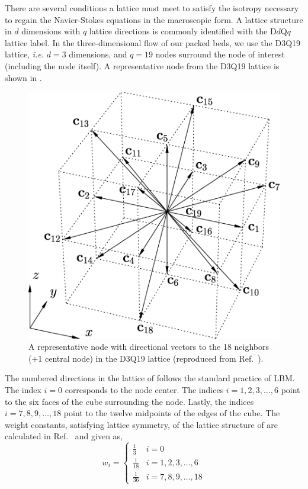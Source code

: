 There are several conditions a lattice must meet to satisfy the isotropy necessary to regain the Navier-Stokes equations in the macroscopic form.\cite{Viggen2009,Latt2007} A lattice structure in $d$ dimensions with $q$ lattice directions is commonly identified with the D$d$Q$q$ lattice label. In the three-dimensional flow of our packed beds, we use the D3Q19 lattice, \textit{i.e.} $d=3$ dimensions, and $q=19$ nodes surround the node of interest (including the node itself). A representative node from the D3Q19 lattice is shown in .
\begin{figure}[t]
	\centering
	\includegraphics[width=\singleimagewidth]{figures/lbm/4193301.jpg}
	\caption{A representative node with directional vectors to the 18 neighbors (+1 central node) in the D3Q19 lattice (reproduced from Ref.~\cite{1742-5468-2010-01-P01018}).}\label{fig:d3q19-lattice}
\end{figure}

The numbered directions in the lattice of  follows the standard practice of LBM. The index $i=0$ corresponds to the node center. The indices $i = 1,2,3,\dots,6$ point to the six faces of the cube surrounding the node. Lastly, the indices $i=7,8,9,\dots,18$ point to the twelve midpoints of the edges of the cube. The weight constants, satisfying lattice symmetry, of the lattice structure of  are calculated in Ref.~\cite{Latt2007} and given as,
\begin{equation}\label{eq:d3q19-weights}
	w_i = \begin{cases}
	\frac{1}{3}			& i = 0\\
	\frac{1}{18} 		& i = 1,2,3,\dots,6\\
	\frac{1}{36}		& i = 7,8,9,\dots,18
	\end{cases}
\end{equation}

